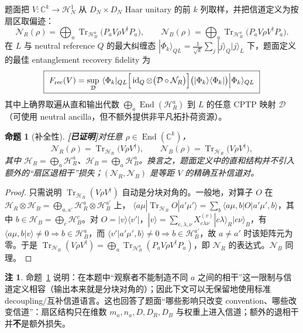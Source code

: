 \documentclass[11pt,a4paper]{ctexart}
\newtheorem{proposition}{命题}
\theoremstyle{definition}
\newtheorem{remark}{注}
\newcommand{\proved}{\textcolor{green!45!black}{\textbf{[已证明]}}}
\newcommand{\Tr}{\operatorname{Tr}}
\newcommand{\End}{\operatorname{End}}
\newcommand{\id}{\operatorname{id}}
\newcommand{\C}{\mathbb{C}}
\newcommand{\Frec}{F_{\rm rec}}
\begin{document}
题面把 $V:\C^k\to\mathcal H_N^1$ 从 $D_N\times D_N$ Haar unitary 的前 $k$ 列取样，并把信道定义为按扇区取偏迹：
\[
\mathcal N_R(\rho)=\bigoplus_a\Tr_{\mathcal H_B^a}\!\big(P_aV\rho V^\dagger P_a\big),\qquad
\mathcal N_B(\rho)=\bigoplus_a\Tr_{\mathcal H_R^a}\!\big(P_aV\rho V^\dagger P_a\big).
\]
在 $L$ 与 neutral reference $Q$ 的最大纠缠态 $|\Phi_k\rangle_{QL}=\frac1{\sqrt k}\sum_j|j\rangle_Q|j\rangle_L$ 下，题面定义的最佳 entanglement recovery fidelity 为
\begin{equation}\label{eq:Q2}
\boxed{\ \Frec(V)=\sup_{\mathcal D}\ \langle\Phi_k|_{QL}\Big[\id_Q\otimes\big(\mathcal D\circ\mathcal N_R\big)\Big]\big(|\Phi_k\rangle\langle\Phi_k|\big)\Big|\Phi_k\rangle_{QL}\ }
\end{equation}
其中上确界取遍从直和输出代数 $\bigoplus_a\End(\mathcal H_R^a)$ 到 $L$ 的任意 CPTP 映射 $\mathcal D$（可使用 neutral ancilla，但不额外提供非平凡拓扑荷资源）。
\begin{proposition}[补全性]\proved{}\label{prop:compl}
对任意 $\rho\in\End(\C^k)$，
\[
\mathcal N_R(\rho)=\Tr_{\mathcal H_B}\!\big(V\rho V^\dagger\big),\qquad
\mathcal N_B(\rho)=\Tr_{\mathcal H_R}\!\big(V\rho V^\dagger\big),
\]
其中 $\mathcal H_R=\bigoplus_a\mathcal H_R^a$、$\mathcal H_B=\bigoplus_a\mathcal H_B^a$。换言之，题面定义中的直和结构并不引入额外的“扇区退相干”损失；$(\mathcal N_R,\mathcal N_B)$ 是等距 $V$ 的精确互补信道对。
\end{proposition}
\begin{proof}
只需说明 $\Tr_{\mathcal H_B}(V\rho V^\dagger)$ 自动是分块对角的。一般地，对算子 $O$ 在 $\mathcal H_R\otimes\mathcal H_B=\bigoplus_{a,a'}\mathcal H_R^a\otimes\mathcal H_B^{a'}$ 上，
$\langle a\mu|\Tr_{\mathcal H_B}O|a'\mu'\rangle=\sum_{b}\langle a\mu,b|O|a'\mu',b\rangle$，其中 $b\in\mathcal H_B=\bigoplus_c\mathcal H_B^c$。对 $O=|v\rangle\langle v'|$，$|v\rangle=\sum_{c,\lambda,\nu}X^{(v)}_{c\lambda\nu}|c\lambda\rangle_R|c\nu\rangle_B$，有 $\langle a\mu,b|v\rangle\neq0\Rightarrow b\in\mathcal H_B^a$，而 $\langle v'|a'\mu',b\rangle\neq0\Rightarrow b\in\mathcal H_B^{a'}$，故 $a\ne a'$ 时该矩阵元为零。于是 $\Tr_{\mathcal H_B}(V\rho V^\dagger)=\bigoplus_a\Tr_{\mathcal H_B^a}(P_aV\rho V^\dagger P_a)$，即 $\mathcal N_R$ 的表达式。$\mathcal N_B$ 同理。
\end{proof}
\begin{remark}
命题~\ref{prop:compl} 说明：在本题中“观察者不能制造不同 $a$ 之间的相干”这一限制与信道定义相容（输出本来就是分块对角的）；因此下文可以无保留地使用标准 decoupling/互补信道语言。这也回答了题面“哪些影响只改变 convention、哪些改变信道”：扇区结构只在维数 $m_a,n_a,D,D_R,D_B$ 与权重上进入信道；额外的退相干并\textbf{不}是额外损失。
\end{remark}
\end{document}
